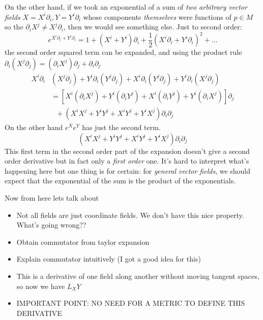 		On the other hand, if we took an exponential of a sum of \emph{two arbitrary vector fields} $X=X^i \partial_i, Y = Y^i \partial_i$ whose components \emph{themselves} were functions of $p \in M$ so the $\partial_i X^j \neq X^j \partial_i$, then we would see something else. Just to second order: 
		\begin{equation}
			e^{X^i \partial_i + Y^i \partial_i} = 1 + (X^i + Y^i) \partial_i + \frac{1}{2} (X^i \partial_i + Y^i \partial_i)^2 + \dots
		\end{equation} 
		the second order squared term can be expanded, and using the product rule $\partial_i (X^j \partial_j) = (\partial_i X^j) \partial_j + \partial_i \partial_j$
		\begin{align*}
			 X^i \partial_i &(X^j \partial_j) + Y^i \partial_i (Y^j \partial_j) + X^i \partial_i (Y^j \partial_j) + Y^i \partial_i (X^j \partial_j) \\
			 &= \left[ X^i (\partial_i X^j)+ Y^i (\partial_i Y^j) + X^i (\partial_i Y^j) + Y^i (\partial_i X^j) \right] \partial_j \\ 
			 & ~~~ + (X^i X^j + Y^i Y^j + X^i Y^j + Y^i X^j) \partial_i \partial_j
		\end{align*}
		On the other hand $e^{X} e^{Y}$ has just the second term. 
		\begin{equation*}
			(X^i X^j + Y^i Y^j + X^i Y^j + Y^i X^j) \partial_i \partial_j
		\end{equation*}
		This first term in the second order part of the expansion doesn't give a second order derivative but in fact only a \emph{first order} one.	It's hard to interpret what's happening here but one thing is for certain: for \emph{general vector fields}, we should expect that the exponential of the sum is the product of the exponentials.
		
		
		
		Now from here lets talk about
		\begin{itemize}
			\item  Not all fields are just coordinate fields. We don't have this nice property. What's going wrong?? 
			\item Obtain commutator from taylor expansion
			\item Explain commutator intuitively (I got a good idea for this)
			\item This is a derivative of one field along another without moving tangent spaces, so now we have $L_X Y$
			\item IMPORTANT POINT: NO NEED FOR A METRIC TO DEFINE THIS DERIVATIVE
		\end{itemize}
		
